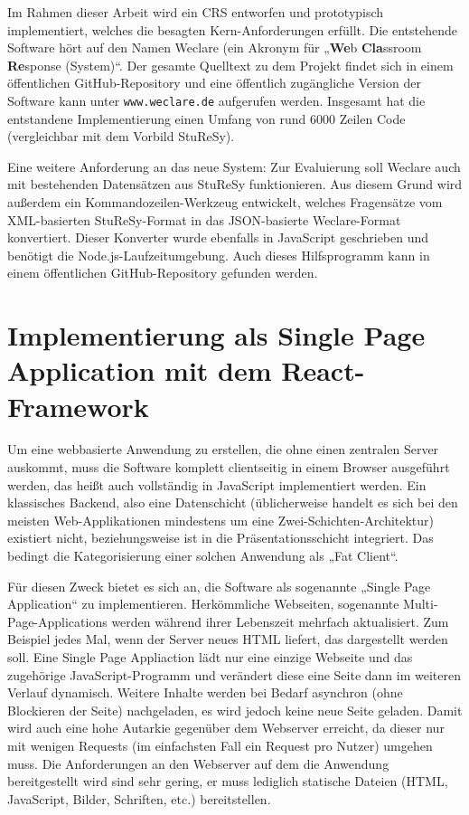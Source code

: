 Im Rahmen dieser Arbeit wird ein CRS entworfen und prototypisch implementiert, welches die besagten Kern-Anforderungen erfüllt. Die entstehende Software hört auf den Namen Weclare (ein Akronym für „\textbf{We}b \textbf{Cla}ssroom \textbf{Re}sponse (System)“. Der gesamte Quelltext zu dem Projekt findet sich in einem öffentlichen GitHub-Repository\cite{web:github_weclare} und eine öffentlich zugängliche Version der Software kann unter \texttt{www.weclare.de} aufgerufen werden. Insgesamt hat die entstandene Implementierung einen Umfang von rund 6000 Zeilen Code (vergleichbar mit dem Vorbild StuReSy).

Eine weitere Anforderung an das neue System: Zur Evaluierung soll Weclare auch mit bestehenden Datensätzen aus StuReSy funktionieren. Aus diesem Grund wird außerdem ein Kommandozeilen-Werkzeug entwickelt, welches Fragensätze vom XML-basierten StuReSy-Format in das JSON-basierte Weclare-Format konvertiert. Dieser Konverter wurde ebenfalls in JavaScript geschrieben und benötigt die Node.js-Laufzeitumgebung. Auch dieses Hilfsprogramm kann in einem öffentlichen GitHub-Repository\cite{web:github_converter} gefunden werden. 

\newpage
\section{Implementierung als Single Page Application mit dem React-Framework}
\label{chap:react_einfuehrung}
Um eine webbasierte Anwendung zu erstellen, die ohne einen zentralen Server auskommt, muss die Software komplett clientseitig in einem Browser ausgeführt werden, das heißt auch vollständig in JavaScript implementiert werden. Ein klassisches Backend, also eine Datenschicht (üblicherweise handelt es sich bei den meisten Web-Applikationen mindestens um eine Zwei-Schichten-Architektur) existiert nicht, beziehungsweise ist in die Präsentationsschicht integriert. Das bedingt die Kategorisierung einer solchen Anwendung als „Fat Client“.

Für diesen Zweck bietet es sich an, die Software als sogenannte „Single Page Application“ zu implementieren. Herkömmliche Webseiten, sogenannte Multi-Page-Applications werden während ihrer Lebenszeit mehrfach aktualisiert. Zum Beispiel jedes Mal, wenn der Server neues HTML liefert, das dargestellt werden soll. Eine Single Page Appliaction lädt nur eine einzige Webseite und das zugehörige JavaScript-Programm und verändert diese eine Seite dann im weiteren Verlauf dynamisch. Weitere Inhalte werden bei Bedarf asynchron (ohne Blockieren der Seite) nachgeladen, es wird jedoch keine neue Seite geladen. Damit wird auch eine hohe Autarkie gegenüber dem Webserver erreicht, da dieser nur mit wenigen Requests (im einfachsten Fall ein Request pro Nutzer) umgehen muss. Die Anforderungen an den Webserver auf dem die Anwendung bereitgestellt wird sind sehr gering, er muss lediglich statische Dateien (HTML, JavaScript, Bilder, Schriften, etc.) bereitstellen.

